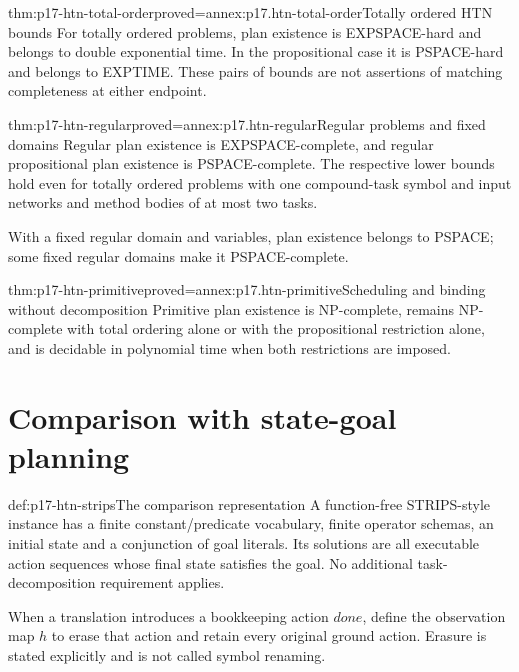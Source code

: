 \begin{hbtheorem}{thm:p17-htn-total-order}{proved=annex:p17.htn-total-order}{Totally ordered HTN bounds}
For totally ordered problems, plan existence is EXPSPACE-hard and belongs to
double exponential time. In the propositional case it is PSPACE-hard and
belongs to EXPTIME. These pairs of bounds are not assertions of matching
completeness at either endpoint.
\end{hbtheorem}

\begin{hbtheorem}{thm:p17-htn-regular}{proved=annex:p17.htn-regular}{Regular problems and fixed domains}
Regular plan existence is EXPSPACE-complete, and regular propositional plan
existence is PSPACE-complete. The respective lower bounds hold even for
totally ordered problems with one compound-task symbol and input networks
and method bodies of at most two tasks.

With a fixed regular domain and variables, plan existence belongs to PSPACE;
some fixed regular domains make it PSPACE-complete.
\end{hbtheorem}

\begin{hbtheorem}{thm:p17-htn-primitive}{proved=annex:p17.htn-primitive}{Scheduling and binding without decomposition}
Primitive plan existence is NP-complete, remains NP-complete with total
ordering alone or with the propositional restriction alone, and is decidable
in polynomial time when both restrictions are imposed.
\end{hbtheorem}

\section{Comparison with state-goal planning}
\label{sec:p17-htn-strips}

\begin{hbdefinition}{def:p17-htn-strips}{The comparison representation}
A function-free STRIPS-style instance has a finite constant/predicate
vocabulary, finite operator schemas, an initial state and a conjunction of
goal literals. Its solutions are all executable action sequences whose final
state satisfies the goal. No additional task-decomposition requirement applies.

When a translation introduces a bookkeeping action \(\mathit{done}\), define
the observation map \(h\) to erase that action and retain every original
ground action. Erasure is stated explicitly and is not called symbol renaming.
\end{hbdefinition}

